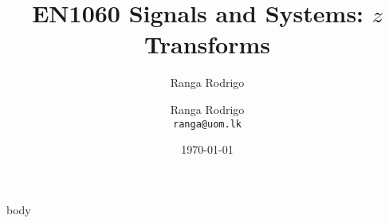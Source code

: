 \documentclass[t, aspectratio=169,xcolor={svgnames}, 10pt]{beamer}
\title{EN1060 Signals and Systems: $z$ Transforms}
\author{Ranga Rodrigo}
\author[]{Ranga Rodrigo\\\texttt{ranga@uom.lk}}
\institute[]{The University of Moratuwa, Sri Lanka}
\date{\today}
\begin{document}
    \begin{frame}
        \titlepage
    \end{frame}
















    {body}


\end{document}

